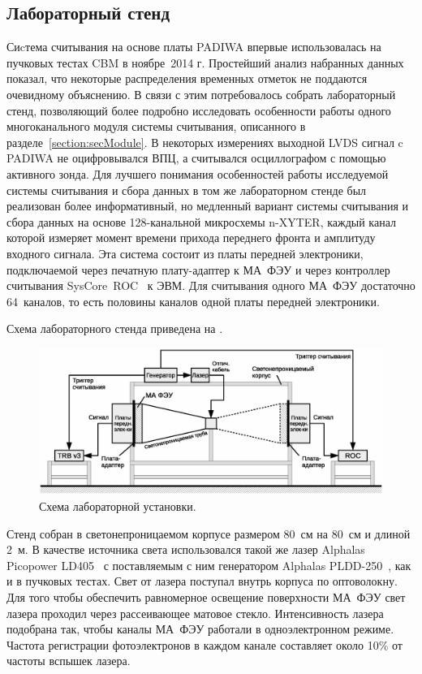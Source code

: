 \subsection{Лабораторный стенд}\label{section:secLabSetup}

Сиcтема считывания на основе платы PADIWA впервые использовалась на пучковых тестах CBM в ноябре~2014 г. Простейший анализ набранных данных показал, что некоторые распределения временных отметок не поддаются очевидному объяснению. В связи с этим потребовалось собрать лабораторный стенд, позволяющий более подробно исследовать особенности работы одного многоканального модуля системы считывания, описанного в разделе~\ref{section:secModule}. В некоторых измерениях выходной LVDS сигнал c PADIWA не оцифровывался ВПЦ, а считывался осциллографом с помощью активного зонда. Для лучшего понимания особенностей работы исследуемой системы считывания и сбора данных в том же лабораторном стенде был реализован более информативный, но медленный вариант системы считывания и сбора данных на основе 128-канальной микросхемы n-XYTER, каждый канал которой измеряет момент времени прихода переднего фронта и амплитуду входного сигнала. Эта система состоит из платы передней электроники, подключаемой через печатную плату-адаптер к МА~ФЭУ и через контроллер считывания SysCore~ROC~\cite{SYSCORE} к ЭВМ. Для считывания одного МА~ФЭУ достаточно 64~каналов, то есть половины каналов одной платы передней электроники.

Схема лабораторного стенда приведена на .

\begin{figure}[H]
\centering
\includegraphics[width=1.0\textwidth]{pictures/12_Lab_setup_3_rus.eps}
\caption{Схема лабораторной установки.}
\label{fig:LabSetup}
\end{figure}

Стенд собран в светонепроницаемом корпусе размером 80~см на 80~см и длиной 2~м. В качестве источника света использовался такой же лазер Alphalas Picopower LD405~\cite{ALPHALAS} с поставляемым с ним генератором Alphalas PLDD-250~\cite{ALPHALAS}, как и в пучковых тестах. Свет от лазера поступал внутрь корпуса по оптоволокну.
Для того чтобы обеспечить равномерное освещение поверхности МА~ФЭУ свет лазера проходил через рассеивающее матовое стекло.
Интенсивность лазера подобрана так, чтобы каналы МА~ФЭУ работали в одноэлектронном режиме. Частота регистрации фотоэлектронов в каждом канале составляет около 10\% от частоты вспышек лазера.

